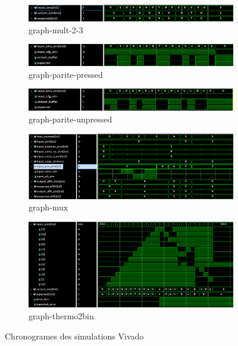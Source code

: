 \begin{figure}[H]
	\begin{subfigure}{.496\linewidth}
		\centering
		\includegraphics[width=\textwidth]{assets/img/graph-mult-2-3.png}
		\caption{graph-mult-2-3}
	\end{subfigure}
	\begin{subfigure}{.496\linewidth}
		\centering
		\includegraphics[width=\textwidth]{assets/img/graph-parite-pressed.png}
		\caption{graph-parite-pressed}
	\end{subfigure}
	\begin{subfigure}{.496\linewidth}
		\centering
		\includegraphics[width=\textwidth]{assets/img/graph-parite-unpressed.png}
		\caption{graph-parite-unpressed}
	\end{subfigure}
	\begin{subfigure}{.496\linewidth}
		\centering
		\includegraphics[width=\textwidth]{assets/img/graph-mux.png}
		\caption{graph-mux}
	\end{subfigure}
	\begin{subfigure}{.496\linewidth}
		\centering
		\includegraphics[width=\textwidth]{assets/img/graph-thermo2bin.png}
		\caption{graph-thermo2bin}
	\end{subfigure}
	\caption{Chronogrames des simulations Vivado}
\end{figure}

